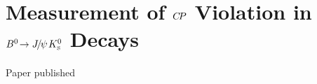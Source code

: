 
\chapter[Measurement of \texorpdfstring{$\CP$}{CP} Violation in \texorpdfstring{$\BdToJpsiKS$}{Bd2JpsiKS} Decays]{Measurement of \texorpdfstring{$\CP$}{CP} Violation in \texorpdfstring{$\BdToJpsiKS$}{Bd2JpsiKS} Decays}
\label{sec:bd2jpsiks}

Paper published~\cite{LHCb-Paper-2015-004}









